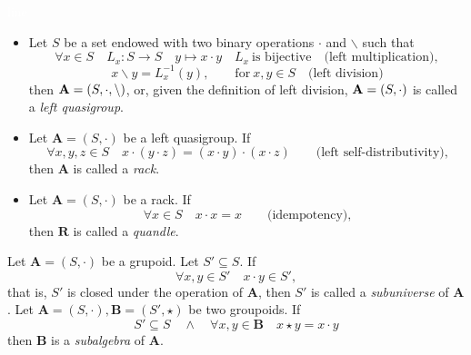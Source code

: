 \documentclass{../mcom-l}
\begin{document}
\begin{definition}\textcolor{white}{line}
\begin{itemize}
    \item Let $S$ be a set endowed with two binary operations $\cdot$ and $\backslash$ such that \[\forall x \in S\quad L_x : S \to S \hspace{1em} y \mapsto x \cdot y \hspace{1em} L_x~\text{is bijective}\hspace{1em}\text{(left multiplication)},\]
\[x\backslash y = L_x^{-1}(y),\hspace{2em}\text{for}~x,y \in S\hspace{1em}\text{(left division)}\]then $\mathbf{A} = (S, \cdot, \backslash)$, or, given the definition of left division, $\mathbf{A} = (S, \cdot)$ is called a \emph{left quasigroup}.  \cite{bonatto2022medial}
\item Let $\mathbf{A} = ( S, \cdot )$ be a left quasigroup. 
If 
\[\forall x,y,z \in S \quad x \cdot (y \cdot z) = (x \cdot y) \cdot (x \cdot z) \hspace{2em}\text{(left self-distributivity),}\]
then $\mathbf{A}$ is called a \emph{rack}.
\item Let $\mathbf{A} = ( S, \cdot )$ be a rack.
If 
\[\forall x \in S \quad x \cdot x = x \hspace{2em}\text{(idempotency),}\]
then $\mathbf{R}$ is called a \emph{quandle}.
\end{itemize}
\end{definition}

\begin{definition}\cite{burris1981course}\newline
Let $\mathbf{A} = (S, \cdot)$ be a grupoid. Let $S'\subseteq S$. If \[\forall x,y \in S'\quad x\cdot y \in S',\]
that is, $S'$ is closed under the operation of $\mathbf{A}$, then $S'$ is called a \emph{subuniverse} of $\mathbf{A}$.\newline\newline
Let $\mathbf{A} = (S, \cdot), \mathbf{B} = (S', \star)$ be two groupoids. If
\[S' \subseteq S \quad\land\quad \forall x,y \in \mathbf{B}\quad x\star y = x\cdot y\]
then $\mathbf{B}$ is a \emph{subalgebra} of $\mathbf{A}$.

\end{definition}
\end{document}
